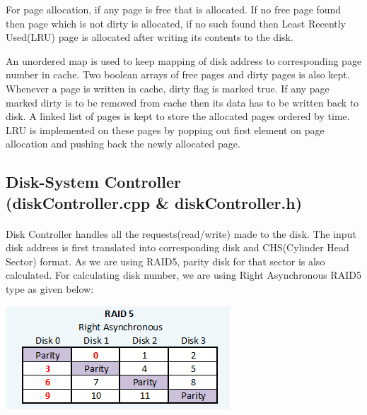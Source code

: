 \documentclass[11pt]{article}
\begin{document}
For page allocation, if any page is free that is allocated. If no free page found then page which is not dirty is allocated, if no such found then Least Recently Used(LRU) page is allocated after writing its contents to the disk.

An unordered map is used to keep mapping of disk address to corresponding page number in cache. Two boolean arrays of free pages and dirty pages is also kept. Whenever a page is written in cache, dirty flag is marked true. If any page marked dirty is to be removed from cache then its data has to be written back to disk. A linked list of pages is kept to store the allocated pages ordered by time. LRU is implemented on these pages by popping out first element on page allocation and pushing back the newly allocated page.

\subsection{Disk-System Controller \\ (diskController.cpp \& diskController.h)}
\paragraph{}
Disk Controller handles all the requests(read/write) made to the disk. The input disk address is first translated into corresponding disk and CHS(Cylinder Head Sector) format. As we are using RAID5, parity disk for that sector is also calculated. For calculating disk number, we are using Right Asynchronous RAID5 type as given below:
\begin{center}
\includegraphics[scale=0.9]{images/raid5.png}
\end{center}
\end{document}
